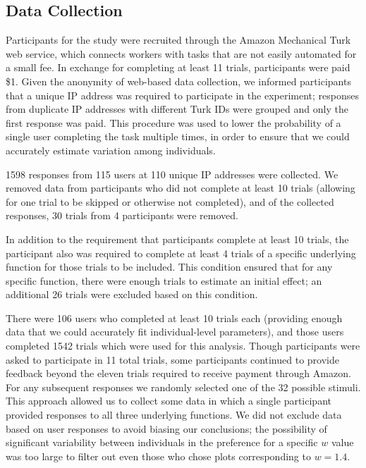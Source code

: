 \documentclass[11pt]{isuthesis}\usepackage[]{graphicx}\usepackage[]{color}
\begin{document}
\subsection{Data Collection}

Participants for the study were recruited through the Amazon Mechanical Turk web service, which connects workers with tasks that are not easily automated for a small fee. In exchange for completing at least 11 trials, participants were paid \$1. Given the anonymity of web-based data collection, we informed participants that a unique IP address was required to participate in the experiment; responses from duplicate IP addresses with different Turk IDs were grouped and only the first response was paid. This procedure was used to lower the probability of a single user completing the task multiple times, in order to ensure that we could accurately estimate variation among individuals. 

1598 responses from 115 users at 110 unique IP addresses were collected. We removed data from participants who did not complete at least 10 trials (allowing for one trial to be skipped or otherwise not completed), and of the collected responses, 30 trials from 4 participants were removed. 

In addition to the requirement that participants complete at least 10 trials, the participant also was required to complete at least 4 trials of a specific underlying function for those trials to be included. This condition ensured that for any specific function, there were enough trials to estimate an initial effect; an additional 26 trials were excluded based on this condition. 

There were 106 users who completed at least 10 trials each (providing enough data that we could accurately fit individual-level parameters), and those users completed 1542 trials which were used for this analysis. Though participants were asked to participate in 11 total trials, some participants continued to provide feedback beyond the eleven trials required to receive payment through Amazon. For any subsequent responses we randomly selected one of the 32 possible stimuli. This approach allowed us to collect some data in which a single participant provided responses to all three underlying functions. We did not exclude data based on user responses to avoid biasing our conclusions; the possibility of significant variability between individuals in the preference for a specific $w$ value was too large to filter out even those who chose plots corresponding to $w=1.4$. 
\end{document}
